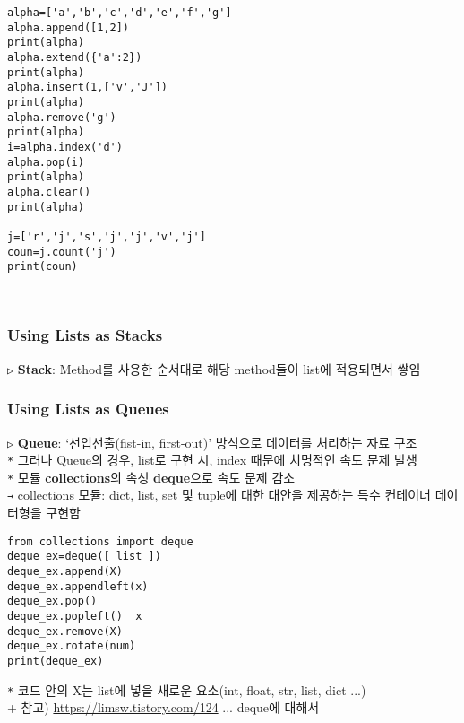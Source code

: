 \documentclass[11pt,a4paper]{article}
\begin{document}
\begin{lstlisting}[label={list:first},caption=List Method]
alpha=['a','b','c','d','e','f','g']
alpha.append([1,2])
print(alpha)
alpha.extend({'a':2})
print(alpha)
alpha.insert(1,['v','J'])
print(alpha)
alpha.remove('g')
print(alpha)
i=alpha.index('d')
alpha.pop(i)
print(alpha)
alpha.clear()
print(alpha)

j=['r','j','s','j','j','v','j']
coun=j.count('j')
print(coun)
\end{lstlisting}\\

\subsubsection{\Large\textbf{Using Lists as Stacks}}
\texttt{▷} \textbf{Stack}: Method를 사용한 순서대로 해당 method들이 list에 적용되면서 쌓임\\

\subsubsection{\Large\textbf{Using Lists as Queues}}
\begin{spacing}{1.5}
\texttt{▷} \textbf{Queue}: `선입선출(fist-in, first-out)' 방식으로 데이터를 처리하는 자료 구조\\
\hspace*{1em}\texttt{*} 그러나 Queue의 경우, list로 구현 시, index 때문에 치명적인 속도 문제 발생\\
\hspace*{1em}\texttt{*} 모듈 \textbf{collections}의 속성 \textbf{deque}으로 속도 문제 감소\\
\hspace*{2em}\texttt{→} collections 모듈: dict, list, set 및 tuple에 대한 대안을 제공하는 특수 컨테이너 데이터형을 구현함
\end{spacing}

\begin{lstlisting}[label={list:first},caption=deque + list Method]
from collections import deque
deque_ex=deque([ list ])
deque_ex.append(X)
deque_ex.appendleft(x)
deque_ex.pop()
deque_ex.popleft()  x
deque_ex.remove(X)
deque_ex.rotate(num)
print(deque_ex)
\end{lstlisting}
\texttt{*} 코드 안의 X는 list에 넣을 새로운 요소(int, float, str, list, dict ...)\\

+ 참고) \url{https://limsw.tistory.com/124} ... deque에 대해서
\end{document}
